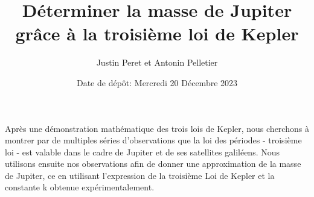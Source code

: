 \documentclass{aa}
\begin{document}
 


   \title{Déterminer la masse de Jupiter grâce à la troisième loi de Kepler}

   \author{Justin Peret et
          Antonin Pelletier
          }


   \date{Date de dépôt: Mercredi 20 Décembre 2023}

 
  \abstract
   { Après une démonstration mathématique des trois lois de Kepler, nous cherchons à montrer par de multiples séries d'observations que la loi des périodes - troisième loi - est valable dans le cadre de Jupiter et de ses satellites galiléens. Nous utilisons ensuite nos observations afin de donner une approximation de la masse de Jupiter, ce en utilisant l'expression de la troisième Loi de Kepler et la constante k obtenue expérimentalement.} 


   \maketitle
%
\end{document}

